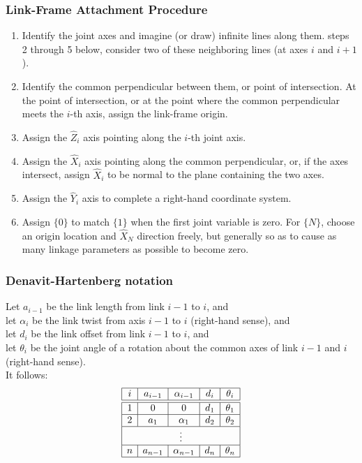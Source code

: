 \documentclass[10pt,a4paper]{article}
\begin{document}
\subsubsection{Link-Frame Attachment Procedure}
\begin{enumerate}
	\item Identify the joint axes and imagine (or draw) infinite lines along them. steps 2 through 5 below, consider two of these neighboring lines (at axes $i$ and $i + 1$).
	\item Identify the common perpendicular between them, or point of intersection. At the point of intersection, or at the point where the common perpendicular meets the $i$-th axis, assign the link-frame origin. 
	\item Assign the $\hat{Z}_i$ axis pointing along the $i$-th joint axis. 
	\item Assign the $\hat{X}_i$ axis pointing along the common perpendicular, or, if the axes intersect, assign $\hat{X}_i$ to be normal to the plane containing the two axes. 
	\item Assign the $\hat{Y}_i$ axis to complete a right-hand coordinate system. 
	\item Assign $\{0\}$ to match $\{1\}$ when the first joint variable is zero. For $\{N\}$, choose an origin location and $\hat{X}_N$ direction freely, but generally so as to cause as many linkage parameters as possible to become zero.
\end{enumerate}

\subsubsection{Denavit-Hartenberg notation}
Let $a_{i-1}$ be the link length from link $i-1$ to $i$, and \\
let $\alpha_i$ be the link twist from axis $i-1$ to $i$ (right-hand sense), and \\
let $d_i$ be the link offset from link $i-1$ to $i$, and \\
let $\theta_i$ be the joint angle of a rotation about the common axes of link $i-1$ and $i$ (right-hand sense). \\
It follows: 
$$
	\begin{array}{|c|c|c|c|c|}
	\hline
	i & a_{i-1} & \alpha_{i-1} & d_i & \theta_i \\
	\hline
	\hline
	1 & 0 & 0 & d_1 & \theta_1 \\
	\hline
	2 &  a_1 & \alpha_1 & d_2 & \theta_2 \\
	\hline
	\multicolumn{5}{|c|}{\vdots} \\
	\hline
	n & a_{n-1} & \alpha_{n-1} & d_n & \theta_n \\
	\hline
	\end{array}
$$
\end{document}
